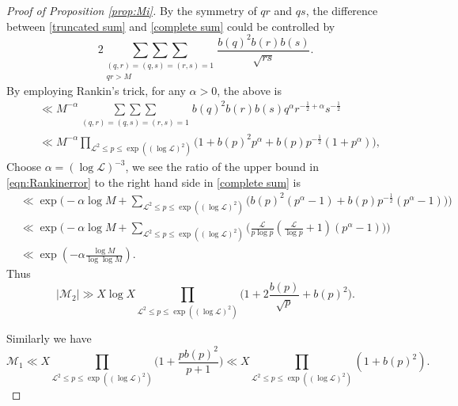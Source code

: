 \documentclass[12pt,reqno]{amsart}
\numberwithin{equation}{section}
\theoremstyle{plain}
\theoremstyle{definition}
\theoremstyle{remark}
\begin{document}
\begin{proof}[Proof of Proposition \ref{prop:Mi}]
By the symmetry of $qr$ and $qs$, the difference between \eqref{truncated sum} and \eqref{complete sum} could be controlled by
  \begin{equation*}
2\underset{\substack{(q,r)=(q,s)=(r,s)=1
  \\qr> M}}
  {\sum\sum\sum}
  \frac{b(q)^2b(r)b(s)}{\sqrt{rs}}.
\end{equation*}
By employing Rankin's trick, for any $\alpha>0$, the above is
\begin{equation}\label{eqn:Rankinerror}
\begin{split}
 &\ll M^{-\alpha}\underset{
 \substack{(q,r)=(q,s)=(r,s)=1}}
  {\sum\sum\sum}b(q)^2 b(r)b(s)
  q^{\alpha}r^{-\frac{1}{2}+\alpha}
s^{-\frac{1}{2}}\\
&\ll M^{-\alpha}
\prod_{\mathcal{L}^2\leq p \leq \exp((\log \mathcal{L})^2)}
\Big(1+b(p)^2p^{\alpha}
  +b(p)p^{-\frac{1}{2}}(1+p^{\alpha})\Big),
\end{split}
\end{equation}
Choose $\alpha=(\log \mathcal{L})^{-3}$, we see the ratio of the upper bound in \eqref{eqn:Rankinerror} to the right hand side in \eqref{complete sum} is
\begin{equation*}\label{eqn:ratioerror}
\begin{split}
&\ll \exp\Bigg(
  -\alpha\log M+\sum_{\mathcal{L}^2\leq p\leq \exp((\log \mathcal{L})^2)}\Big(
 b(p)^2(p^{\alpha}-1)
 +b(p)p^{-\frac{1}{2}}(p^{\alpha}-1)
  \Big)
  \Bigg)\\
  &\ll \exp\Bigg(
  -\alpha\log M+\sum_{\mathcal{L}^2\leq p\leq \exp((\log \mathcal{L})^2)}\bigg(
  \frac{\mathcal{L}}{p\log p}(\frac{\mathcal{L}}{\log p}+1)(p^\alpha-1)
  \bigg)
  \Bigg)\\
     & \ll \exp(-\alpha\frac{\log M}{\log\log M}).
\end{split}
\end{equation*}
Thus
\begin{equation*}
   |\mathcal{M}_2|\gg
   X\log X \prod_{\mathcal{L}^2\leq p \leq \exp((\log \mathcal{L})^2)}
  \bigg(1+2\frac{b(p)}{\sqrt{p}}+b(p)^2\bigg).
\end{equation*}

Similarly we have
\begin{equation*}
  \mathcal{M}_1\ll X\prod_{\mathcal{L}^2\leq p \leq \exp((\log \mathcal{L})^2)}
\bigg(1+\frac{p b(p)^2}{p+1}\bigg)\ll X\prod_{\mathcal{L}^2\leq p \leq \exp((\log \mathcal{L})^2)}
(1+ b(p)^2).
\end{equation*}
\end{proof}
\end{document}

